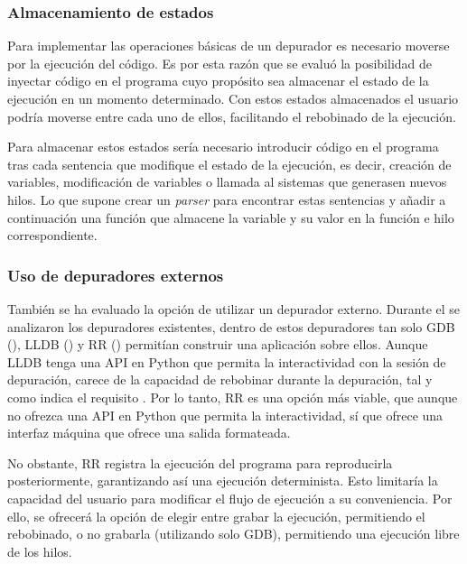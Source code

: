 \subsubsection{Almacenamiento de estados} \label{subsec:almacenamiento-estados}

Para implementar las operaciones básicas de un depurador es necesario moverse por la ejecución del código. Es por esta razón que se evaluó la posibilidad de \gls{inyectar código} en el programa cuyo propósito sea almacenar el estado de la ejecución en un momento determinado. Con estos estados almacenados el usuario podría moverse entre cada uno de ellos, facilitando el rebobinado de la ejecución.

Para almacenar estos estados sería necesario introducir código en el programa tras cada \gls{sentencia} que modifique el estado de la ejecución, es decir, creación de variables, modificación de variables o \glspl{llamada al sistema} que generasen nuevos \glspl{hilo}. Lo que supone crear un \textit{\gls{parser}} para encontrar estas \glspl{sentencia} y añadir a continuación una función que almacene la variable y su valor en la función e \gls{hilo} correspondiente. 


\subsubsection{Uso de depuradores externos} \label{subsec:depuradores-externos}

También se ha evaluado la opción de utilizar un depurador externo. Durante el  se analizaron los depuradores existentes, dentro de estos depuradores tan solo GDB (), LLDB () y RR () permitían construir una aplicación sobre ellos. Aunque LLDB tenga una \gls{API} en Python que permita la interactividad con la sesión de depuración, carece de la capacidad de rebobinar durante la depuración, tal y como indica el requisito . Por lo tanto, RR es una opción más viable, que aunque no ofrezca una \gls{API} en Python que permita la interactividad, sí que ofrece una interfaz máquina que ofrece una salida formateada.

No obstante, RR registra la ejecución del programa para reproducirla posteriormente, garantizando así una ejecución determinista. Esto limitaría la capacidad del usuario para modificar el flujo de ejecución a su conveniencia. Por ello, se ofrecerá la opción de elegir entre grabar la ejecución, permitiendo el rebobinado, o no grabarla (utilizando solo GDB), permitiendo una ejecución libre de los \glspl{hilo}.

